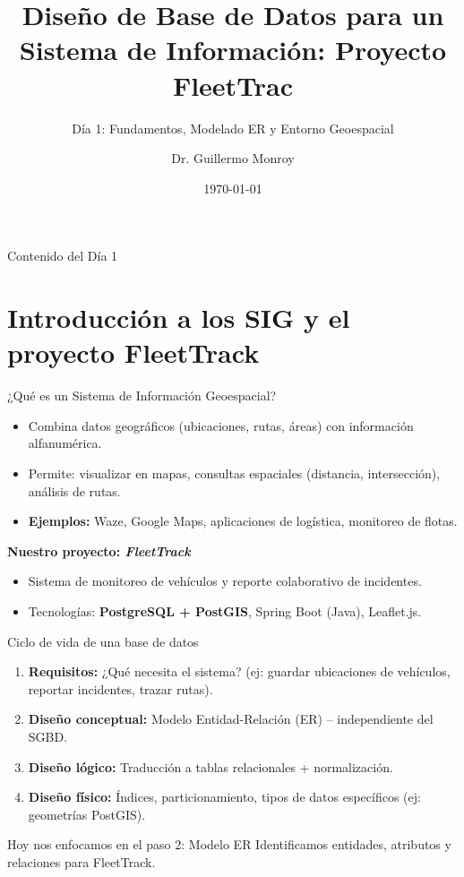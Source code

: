 \documentclass[10pt, aspectratio=169]{beamer}
\title{Diseño de Base de Datos para un Sistema de Información: Proyecto FleetTrac}
\subtitle{Día 1: Fundamentos, Modelado ER y Entorno Geoespacial}
\author{Dr. Guillermo Monroy}
\institute{UAMC}
\date{\today}
\begin{document}
\begin{frame}
    \titlepage
\end{frame}

\begin{frame}{Contenido del Día 1}
    \tableofcontents
\end{frame}

\section{Introducción a los SIG y el proyecto FleetTrack}
\begin{frame}{¿Qué es un Sistema de Información Geoespacial?}
    \begin{itemize}
        \item Combina datos geográficos (ubicaciones, rutas, áreas) con información alfanumérica.
        \item Permite: visualizar en mapas, consultas espaciales (distancia, intersección), análisis de rutas.
        \item \textbf{Ejemplos:} Waze, Google Maps, aplicaciones de logística, monitoreo de flotas.
    \end{itemize}
    \vspace{0.5cm}
    \textbf{Nuestro proyecto: \textit{FleetTrack}}
    \begin{itemize}
        \item Sistema de monitoreo de vehículos y reporte colaborativo de incidentes.
        \item Tecnologías: \textbf{PostgreSQL + PostGIS}, Spring Boot (Java), Leaflet.js.
    \end{itemize}
\end{frame}

\begin{frame}{Ciclo de vida de una base de datos}
    \begin{enumerate}
        \item \textbf{Requisitos:} ¿Qué necesita el sistema? (ej: guardar ubicaciones de vehículos, reportar incidentes, trazar rutas).
        \item \textbf{Diseño conceptual:} Modelo Entidad-Relación (ER) – independiente del SGBD.
        \item \textbf{Diseño lógico:} Traducción a tablas relacionales + normalización.
        \item \textbf{Diseño físico:} Índices, particionamiento, tipos de datos específicos (ej: geometrías PostGIS).
    \end{enumerate}
    \begin{block}{Hoy nos enfocamos en el paso 2: \alert{Modelo ER}}
        Identificamos entidades, atributos y relaciones para FleetTrack.
    \end{block}
\end{frame}
\end{document}
